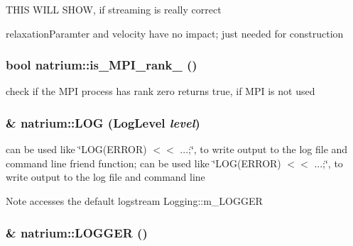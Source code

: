THIS WILL SHOW, if streaming is really correct

relaxationParamter and velocity have no impact; just needed for construction \hypertarget{namespacenatrium_a791202a0d8b6bdac2c62f3ae63905a36}{
\subsubsection[{is\_\-MPI\_\-rank\_\-0}]{\setlength{\rightskip}{0pt plus 5cm}bool natrium::is\_\-MPI\_\-rank\_ ()}}
\label{namespacenatrium_a791202a0d8b6bdac2c62f3ae63905a36}
check if the MPI process has rank zero returns true, if MPI is not used \hypertarget{namespacenatrium_a0590621d19e4629e6afb5e7365f9f331}{
\subsubsection[{LOG}]{\& natrium::LOG (LogLevel {\em level})}}
\label{namespacenatrium_a0590621d19e4629e6afb5e7365f9f331}


can be used like \char`\"{}LOG(ERROR) $<$$<$ ...;\char`\"{}, to write output to the log file and command line friend function; can be used like \char`\"{}LOG(ERROR) $<$$<$ ...;\char`\"{}, to write output to the log file and command line

\begin{DoxyNote}{Note}
accesses the default logstream Logging::m\_\-LOGGER 
\end{DoxyNote}
\hypertarget{namespacenatrium_a0d879cf404d8a12fc978ab97d33758b4}{
\subsubsection[{LOGGER}]{\& natrium::LOGGER ()}}
\label{namespacenatrium_a0d879cf404d8a12fc978ab97d33758b4}


